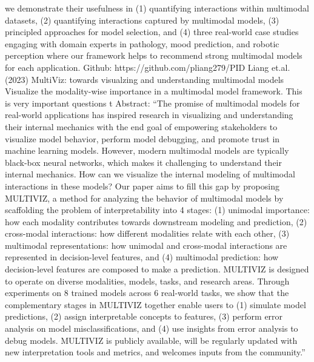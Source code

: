 \documentclass{article}%
\begin{document}
%
we demonstrate their usefulness in (1) quantifying interactions within multimodal%
\newline%
\newline%
%
datasets, (2) quantifying interactions captured by multimodal models, (3) principled%
\newline%
\newline%
%
approaches for model selection, and (4) three real{-}world case studies engaging with%
\newline%
\newline%
%
domain experts in pathology, mood prediction, and robotic perception where our%
\newline%
\newline%
%
framework helps to recommend strong multimodal models for each application.%
\newline%
\newline%
%
Github: https://github.com/pliang279/PID %
\newline%
\newline%
%
Liang et.al. (2023) MultiViz: towards visualzing and understanding multimodal models%
\newline%
\newline%
%
Visualize the modality{-}wise importance in a multimodal model framework.%
\newline%
\newline%
%
This is very important questions t%
\newline%
\newline%
%
Abstract: “The promise of multimodal models for real{-}world applications has inspired research in visualizing and understanding their internal mechanics with the end goal of empowering stakeholders to visualize model behavior, perform model debugging, and promote trust in machine learning models. However, modern multimodal models are typically black{-}box neural networks, which makes it challenging to understand their internal mechanics. How can we visualize the internal modeling of multimodal interactions in these models? Our paper aims to fill this gap by proposing MULTIVIZ, a method for analyzing the behavior of multimodal models by scaffolding the problem of interpretability into 4 stages: (1) unimodal importance: how each modality contributes towards downstream modeling and prediction, (2) cross{-}modal interactions: how different modalities relate with each other, (3) multimodal representations: how unimodal and cross{-}modal interactions are represented in decision{-}level features, and (4) multimodal prediction: how decision{-}level features are composed to make a prediction. MULTIVIZ is designed to operate on diverse modalities, models, tasks, and research areas. Through experiments on 8 trained models across 6 real{-}world tasks, we show that the complementary stages in MULTIVIZ together enable users to (1) simulate model predictions, (2) assign interpretable concepts to features, (3) perform error analysis on model misclassifications, and (4) use insights from error analysis to debug models. MULTIVIZ is publicly available, will be regularly updated with new interpretation tools and metrics, and welcomes inputs from the community.”%
\end{document}
